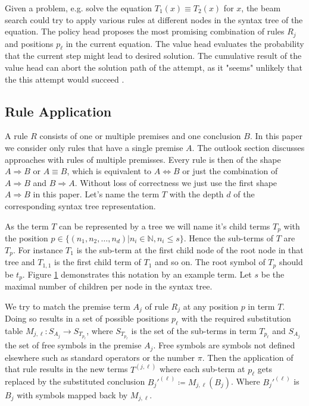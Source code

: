 \documentclass{scrartcl}
\theoremstyle{definition}
\begin{document}
Given a problem, e.g. solve the equation $T_1\left(x\right)\equiv T_2\left(x\right)$ for $x$,
the beam search could try to apply various rules at different nodes in the syntax tree of the equation.
The policy head proposes the most promising combination of rules $R_j$ and positions $p_\ell$ in the current equation.
The value head evaluates the probability that the current step might lead to desired solution.
The cumulative result of the value head can abort the solution path of the attempt, as it "seems" unlikely that the this attempt would succeed \cite{44806}.

\subsection{Rule Application}

A rule $R$ consists of one or multiple premises and one conclusion $B$.
In this paper we consider only rules that have a single premise $A$.
The outlook section discusses approaches with rules of multiple premisses. 
Every rule is then of the shape $A \Longrightarrow B$ or $A \equiv B$, which is equivalent to $A \Longleftrightarrow B$ or just the combination of $A \Longrightarrow B$ and $B \Longrightarrow A$.
Without loss of correctness we just use the first shape $A \Longrightarrow B$ in this paper.
Let's name the term $T$ with the depth $d$ of the corresponding syntax tree representation.

\begin{figure}[!htbp]
	\centering
	
	\label{fig:sxntax_tree}
\end{figure}

As the term $T$ can be represented by a tree we will name it's child terms $T_p$ with the position $p \in \big\{\left( n_1, n_2, \dots, n_d \right) | n_i \in \mathbb{N}, n_i \leq s \big\}$.
Hence the sub-terms of $T$ are $T_p$.
For instance $T_1$ is the sub-term at the first child node of the root node in that tree and $T_{1,1}$ is the first child term of $T_1$ and so on.
The root symbol of $T_p$ should be $t_p$.
Figure \ref{fig:sxntax_tree} demonstrates this notation by an example term.
Let $s$ be the maximal number of children per node in the syntax tree.

We try to match the premise term $A_j$ of rule $R_j$ at any position $p$ in term $T$.
Doing so results in a set of possible positions $p_\ell$ with the required substitution table ${M_{j,\ell}: S_{A_j} \to S_{T_{p_\ell}}}$,
where $S_{T_{p_\ell}}$ is the set of the sub-terms in term $T_{p_\ell}$ and $S_{A_j}$ the set of free symbols in the premise $A_j$.
Free symbols are symbols not defined elsewhere such as standard operators or the number $\pi$.
Then the application of that rule results in the new terms $T^{(j,\ell)}$ where each sub-term at $p_\ell$ gets replaced by the substituted conclusion ${B_j'^{(\ell)} \coloneqq M_{j,\ell}\left( B_j \right)}$.
Where $B_j'^{(\ell)}$ is $B_j$ with symbols mapped back by $M_{j,\ell}$. 
\end{document}
